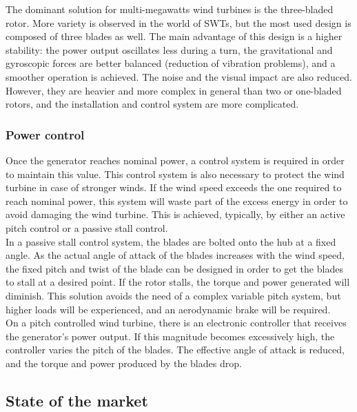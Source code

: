\documentclass[../TFG_Report.tex]{subfiles}
\begin{document}
The dominant solution for multi-megawatts wind turbines is the three-bladed rotor. More variety is observed in the world of SWTs, but the most used design is composed of three blades as well. The main advantage of this design is a higher stability: the power output oscillates less during a turn, the gravitational and gyroscopic forces are better balanced (reduction of vibration problems), and a smoother operation is achieved. The noise and the visual impact are also reduced. However, they are heavier and more complex in general than two or one-bladed rotors, and the installation and control system are more complicated. \cite{Apunts}

\subsubsection*{Power control}

Once the generator reaches nominal power, a control system is required in order to maintain this value. This control system is also necessary to protect the wind turbine in case of stronger winds. If the wind speed exceeds the one required to reach nominal power, this system will waste part of the excess energy in order to avoid damaging the wind turbine. This is achieved, typically, by either an active pitch control or a passive stall control. \\

In a passive stall control system, the blades are bolted onto the hub at a fixed angle. As the actual angle of attack of the blades increases with the wind speed, the fixed pitch and twist of the blade can be designed in order to get the blades to stall at a desired point. If the rotor stalls, the torque and power generated will diminish. This solution avoids the need of a complex variable pitch system, but higher loads will be experienced, and an aerodynamic brake will be required. \\

On a pitch controlled wind turbine, there is an electronic controller that receives the generator's power output. If this magnitude becomes excessively high, the controller varies the pitch of the blades. The effective angle of attack is reduced, and the torque and power produced by the blades drop. \cite{Dromstorre}



\subsection{State of the market} \label{State_market}
\end{document}
